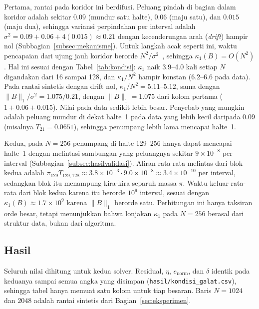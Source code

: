 \documentclass[12pt,a4paper]{article}
\numberwithin{equation}{section}
\begin{document}
Pertama, rantai pada koridor ini berdifusi. Peluang pindah di bagian dalam koridor adalah sekitar $0.09$ (mundur satu
halte), $0.06$ (maju satu), dan $0.015$ (maju dua), sehingga variansi perpindahan per interval adalah
$\sigma^2=0.09+0.06+4(0.015)\approx0.21$ dengan kecenderungan arah (\emph{drift}) hampir nol
(Subbagian~\ref{subsec:mekanisme}). Untuk langkah acak seperti ini, waktu pencapaian dari ujung jauh koridor
berorde $N^2/\sigma^2$~\cite{norris}, sehingga $\kappa_1(B)=O(N^2)$. Hal ini sesuai dengan Tabel~\ref{tab:kondisi}:
$\kappa_1$ naik 3.9--4.0 kali setiap $N$ digandakan dari 16 sampai 128, dan $\kappa_1/N^2$ hampir konstan (6.2--6.6 pada data). Pada rantai
sintetis dengan drift nol, $\kappa_1/N^2=5.11$--$5.12$, sama dengan $\lVert B\rVert_1/\sigma^2=1.075/0.21$, dengan $\lVert B\rVert_1=1.075$ dari kolom pertama
($1+0.06+0.015$). Nilai pada data sedikit lebih besar. Penyebab yang mungkin adalah peluang mundur di dekat halte~1 pada
data yang lebih kecil daripada $0.09$ (misalnya $T_{21}=0.0651$), sehingga penumpang lebih lama mencapai halte~1.

Kedua, pada $N=256$ penumpang di halte 129--256 hanya dapat mencapai halte~1 dengan melintasi sambungan yang peluangnya
sekitar $9\times10^{-8}$ per interval (Subbagian~\ref{subsec:hasilvalidasi}). Aliran rata-rata melintas dari blok kedua
adalah $\pi_{129}T_{129,128}\approx3.8\times10^{-3}\cdot9.0\times10^{-8}\approx3.4\times10^{-10}$ per interval, sedangkan
blok itu menampung kira-kira separuh massa $\pi$. Waktu keluar rata-rata dari blok kedua karena itu berorde $10^{9}$
interval, sesuai dengan $\kappa_1(B)\approx1.7\times10^{9}$ karena $\lVert B\rVert_1$ berorde satu. Perhitungan ini
hanya taksiran orde besar, tetapi menunjukkan bahwa lonjakan $\kappa_1$ pada $N=256$ berasal dari struktur data, bukan dari
algoritma.

\subsection{Hasil}\label{subsec:hasilkondisi}
Seluruh nilai dihitung untuk kedua solver. Residual, $\eta$, $e_{\mathrm{norm}}$, dan $\delta$ identik pada keduanya
sampai semua angka yang disimpan (\texttt{hasil/kondisi\_galat.csv}), sehingga tabel hanya memuat satu kolom untuk
tiap besaran. Baris $N=1024$ dan $2048$ adalah rantai sintetis dari Bagian~\ref{sec:eksperimen}.
\end{document}
